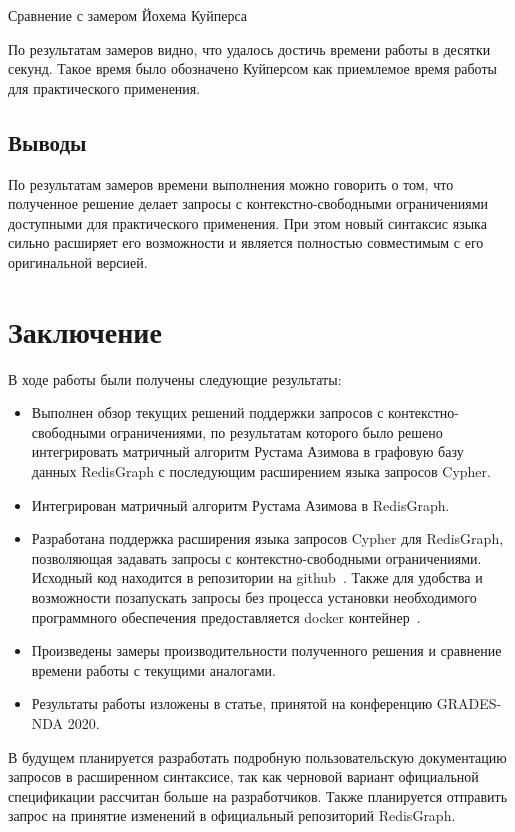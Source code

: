 \documentclass[14pt]{matmex-diploma-custom}
\newcommand{\gsv}[1]{\textcolor{red}{#1$^{\text{gsv}}$}}
\begin{document}
\begin{table}[h!]
\begin{adjustbox}{max width=\textwidth}

\end{adjustbox}
\caption{Сравнение с замером Йохема Куйперса}
\label{tab:neo4j-vs-redisgraph}
\end{table}

По результатам замеров видно, что удалось достичь времени работы в десятки секунд. Такое время было обозначено Куйперсом как приемлемое время работы для практического применения.


\subsection{Выводы}
По результатам замеров времени выполнения можно говорить о том, что полученное решение делает запросы с контекстно-свободными ограничениями доступными для практического применения. При этом новый синтаксис языка сильно расширяет его возможности и является полностью совместимым с его оригинальной версией.

\section*{Заключение}
В ходе работы были получены следующие результаты:
\begin{itemize}
\item Выполнен обзор текущих решений поддержки запросов с кон\-текстно-свободными ограничениями, по результатам которого было решено интегрировать матричный алгоритм Рустама Азимова в графовую базу данных RedisGraph с последующим расширением языка запросов Cypher. 
\item Интегрирован матричный алгоритм Рустама Азимова в RedisGraph.
\item Разработана поддержка расширения языка запросов Cypher для RedisGraph, позволяющая задавать запросы с конте\-кстно-сво\-бод\-ными ограничениями. Исходный код находится в репозитории на github~\cite{github}. Также для удобства и возможности позапускать запросы без процесса установки необходимого программного обеспечения предоставляется docker контейнер~\cite{docker}.
\item Произведены замеры производительности полученного решения и сравнение времени работы с текущими аналогами.
\item Результаты работы изложены в статье, принятой на конференцию GRADES-NDA 2020.
\end{itemize}

В будущем планируется разработать подробную пользовательскую документацию запросов в расширенном синтаксисе, так как черновой вариант официальной спецификации рассчитан больше на разработчиков. Также планируется отправить запрос на принятие изменений в официальный репозиторий RedisGraph. 

\setmonofont[Mapping=tex-text]{CMU Typewriter Text}


\end{document}
